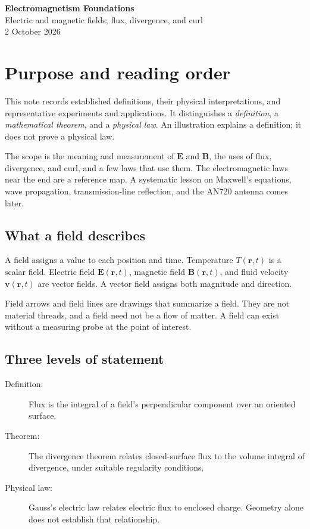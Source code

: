 \documentclass[11pt,letterpaper]{article}
\newcommand{\vect}[1]{\boldsymbol{#1}}
\begin{document}
\begin{center}
{\LARGE\bfseries\color{ink} Electromagnetism Foundations}\\[6pt]
{\large Electric and magnetic fields; flux, divergence, and curl}\\[6pt]
{\small 2 October 2026}
\end{center}

\section*{Purpose and reading order}
This note records established definitions, their physical interpretations, and representative experiments and applications. It distinguishes a \emph{definition}, a \emph{mathematical theorem}, and a \emph{physical law}. An illustration explains a definition; it does not prove a physical law.

The scope is the meaning and measurement of $\vect E$ and $\vect B$, the uses of flux, divergence, and curl, and a few laws that use them. The electromagnetic laws near the end are a reference map. A systematic lesson on Maxwell's equations, wave propagation, transmission-line reflection, and the AN720 antenna comes later.

\subsection*{What a field describes}
A field assigns a value to each position and time. Temperature $T(\vect r,t)$ is a scalar field. Electric field $\vect E(\vect r,t)$, magnetic field $\vect B(\vect r,t)$, and fluid velocity $\vect v(\vect r,t)$ are vector fields. A vector field assigns both magnitude and direction.

Field arrows and field lines are drawings that summarize a field. They are not material threads, and a field need not be a flow of matter. A field can exist without a measuring probe at the point of interest.

\subsection*{Three levels of statement}
\begin{description}
\item[Definition:] Flux is the integral of a field's perpendicular component over an oriented surface.
\item[Theorem:] The divergence theorem relates closed-surface flux to the volume integral of divergence, under suitable regularity conditions.
\item[Physical law:] Gauss's electric law relates electric flux to enclosed charge. Geometry alone does not establish that relationship.
\end{description}
\end{document}
